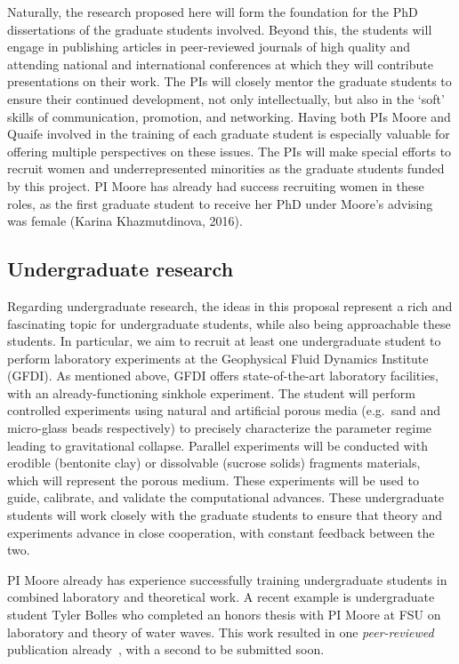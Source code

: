 \documentclass[11pt]{article}
\begin{document}
	Naturally, the research proposed here will form the foundation for the PhD dissertations of the graduate students involved. Beyond this, the students will engage in publishing articles in peer-reviewed journals of high quality and attending national and international conferences at which they will contribute presentations on their work. The PIs will closely mentor the graduate students to ensure their continued development, not only intellectually, but also in the `soft' skills of communication, promotion, and networking. Having both PIs Moore and Quaife involved in the training of each graduate student is especially valuable for offering multiple perspectives on these issues. The PIs will make special efforts to recruit women and underrepresented minorities as the graduate students funded by this project. PI Moore has already had success recruiting women in these roles, as the first graduate student to receive her PhD under Moore's advising was female (Karina Khazmutdinova, 2016).


\subsection{Undergraduate research}

Regarding undergraduate research, the ideas in this proposal represent a rich and fascinating topic for undergraduate students, while also being approachable these students. In particular, we aim to recruit at least one undergraduate student to perform laboratory experiments at the Geophysical Fluid Dynamics Institute (GFDI). As mentioned above, GFDI offers state-of-the-art laboratory facilities, with an already-functioning sinkhole experiment. The student will perform controlled experiments using natural and artificial porous media (e.g.~sand and micro-glass beads respectively) to precisely characterize the parameter regime leading to gravitational collapse. Parallel experiments will be conducted with erodible (bentonite clay) or dissolvable  (sucrose solids) fragments materials, which will represent the porous medium. These experiments will be used to guide, calibrate, and validate the computational advances. These undergraduate students will work closely with the graduate students to ensure that theory and experiments advance in close cooperation, with constant feedback between the two.

PI Moore already has experience successfully training undergraduate students in combined laboratory and theoretical work. A recent example is undergraduate student Tyler Bolles who completed an honors thesis with PI Moore at FSU on laboratory and theory of water waves. This work resulted in one {\em peer-reviewed} publication already~\cite{Bolles2019}, with a second to be submitted soon.
\end{document}
